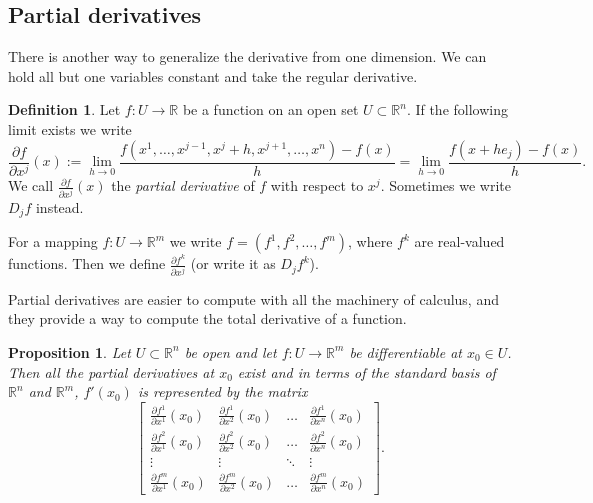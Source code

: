 \documentclass[12pt]{book}
\newcommand{\R}{{\mathbb{R}}}
\newcommand{\myindex}[1]{#1\index{#1}}
\theoremstyle{plain}
\newtheorem{prop}[thm]{Proposition}
\theoremstyle{remark}
\theoremstyle{definition}
\newtheorem{defn}[thm]{Definition}
\theoremstyle{exercise}
\theoremstyle{example}
\begin{document}
\subsection{Partial derivatives}

There is another way to generalize the derivative from one dimension.
We can hold all but one variables constant and take the regular
derivative.

\begin{defn}
Let
$f \colon U \to \R$ be a function on an open set $U \subset \R^n$.
If the following limit exists we write
\begin{equation*}
\frac{\partial f}{\partial x^j} (x) := 
\lim_{h\to 0}\frac{f(x^1,\ldots,x^{j-1},x^j+h,x^{j+1},\ldots,x^n)-f(x)}{h}
=
\lim_{h\to 0}\frac{f(x+h e_j)-f(x)}{h} .
\end{equation*}
We call 
$\frac{\partial f}{\partial x^j} (x)$ the \emph{\myindex{partial derivative}}
of $f$
with respect to $x^j$.  Sometimes we write $D_j f$ instead.

For a mapping $f \colon U \to \R^m$ we write
$f = (f^1,f^2,\ldots,f^m)$, where $f^k$ are real-valued
functions.  Then we define
$\frac{\partial f^k}{\partial x^j}$ (or write it as $D_j f^k$).
\end{defn}

Partial derivatives are easier to compute with all the machinery of
calculus, and they provide a way to compute the total derivative of a
function.

\begin{prop}
Let $U \subset \R^n$ be open and let $f \colon U \to \R^m$ be
differentiable at $x_0 \in U$.  Then all the partial derivatives at $x_0$
exist and in terms of the standard basis of $\R^n$ and $\R^m$,
$f'(x_0)$ is represented by the matrix
\begin{equation*}
\begin{bmatrix}
\frac{\partial f^1}{\partial x^1}(x_0)
&
\frac{\partial f^1}{\partial x^2}(x_0)
& \ldots &
\frac{\partial f^1}{\partial x^n}(x_0)
\\
\frac{\partial f^2}{\partial x^1}(x_0)
&
\frac{\partial f^2}{\partial x^2}(x_0)
& \ldots &
\frac{\partial f^2}{\partial x^n}(x_0)
\\
\vdots & \vdots & \ddots & \vdots
\\
\frac{\partial f^m}{\partial x^1}(x_0)
&
\frac{\partial f^m}{\partial x^2}(x_0)
& \ldots &
\frac{\partial f^m}{\partial x^n}(x_0)
\end{bmatrix} .
\end{equation*}
\end{prop}
\end{document}

